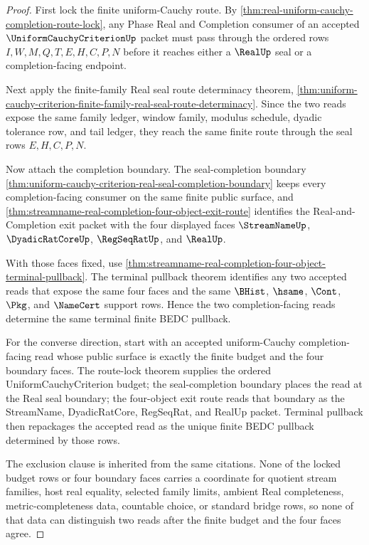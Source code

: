 \begin{proof}
First lock the finite uniform-Cauchy route. By
\autoref{thm:real-uniform-cauchy-completion-route-lock}, any Phase Real and
Completion consumer of an accepted $\UniformCauchyCriterionUp$ packet must pass
through the ordered rows $I,W,M,Q,T,E,H,C,P,N$ before it reaches either a
$\RealUp$ seal or a completion-facing endpoint.

Next apply the finite-family Real seal route determinacy theorem,
\autoref{thm:uniform-cauchy-criterion-finite-family-real-seal-route-determinacy}.
Since the two reads expose the same family ledger, window family, modulus
schedule, dyadic tolerance row, and tail ledger, they reach the same finite
route through the seal rows $E,H,C,P,N$.

Now attach the completion boundary. The seal-completion boundary
\autoref{thm:uniform-cauchy-criterion-real-seal-completion-boundary} keeps every
completion-facing consumer on the same finite public surface, and
\autoref{thm:streamname-real-completion-four-object-exit-route} identifies the
Real-and-Completion exit packet with the four displayed faces
$\StreamNameUp$, $\DyadicRatCoreUp$, $\RegSeqRatUp$, and $\RealUp$.

With those faces fixed, use
\autoref{thm:streamname-real-completion-four-object-terminal-pullback}. The
terminal pullback theorem identifies any two accepted reads that expose the
same four faces and the same $\BHist$, $\hsame$, $\Cont$, $\Pkg$, and
$\NameCert$ support rows. Hence the two completion-facing reads determine the
same terminal finite BEDC pullback.

For the converse direction, start with an accepted uniform-Cauchy
completion-facing read whose public surface is exactly the finite budget and
the four boundary faces. The route-lock theorem supplies the ordered
UniformCauchyCriterion budget; the seal-completion boundary places the read at
the Real seal boundary; the four-object exit route reads that boundary as the
StreamName, DyadicRatCore, RegSeqRat, and RealUp packet. Terminal pullback then
repackages the accepted read as the unique finite BEDC pullback determined by
those rows.

The exclusion clause is inherited from the same citations. None of the locked
budget rows or four boundary faces carries a coordinate for quotient stream
families, host real equality, selected family limits, ambient Real completeness,
metric-completeness data, countable choice, or standard bridge rows, so none of
that data can distinguish two reads after the finite budget and the four faces
agree.
\end{proof}

